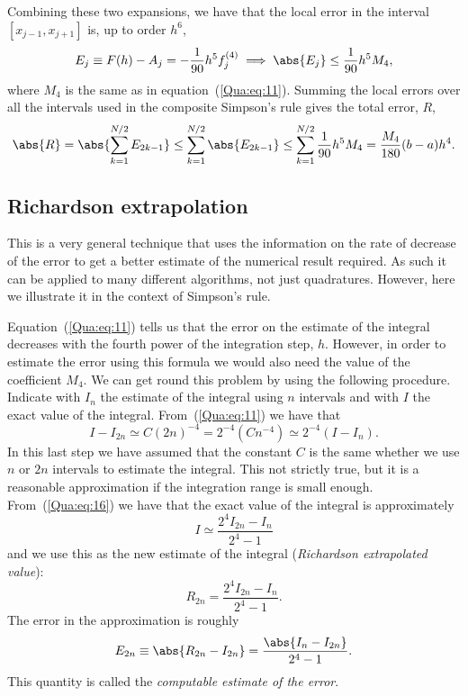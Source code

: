 %
Combining these two expansions, we have that the local error in the
interval $[x_{j-1},x_{j+1}]$ is, up to order $h^6$,
%
\begin{equation}
  E_j \equiv F(h) - A_j = - \frac{1}{90} h^5 f_j^{(4)} \implies
  \abs{E_j} \le \frac{1}{90} h^5 M_4 ,
  \label{Qua:eq:31}
\end{equation}
%
where $M_4$ is the same as in equation~(\ref{Qua:eq:11}).  Summing the
local errors over all the intervals used in the composite Simpson's
rule gives the total error, $R$,
%
\begin{equation}
  \abs{R} = \abs{\sum_{k=1}^{N/2} E_{2k-1}} \le
  \sum_{k=1}^{N/2} \abs{ E_{2k-1} } \le
  \sum_{k=1}^{N/2} \frac{1}{90} h^5 M_4 = \frac{M_4}{180}(b-a)h^4.
\end{equation}

\subsection{Richardson extrapolation}

This is a very general technique that uses the information on the rate
of decrease of the error to get a better estimate of the numerical
result required.  As such it can be applied to many different
algorithms, not just quadratures.  However, here we illustrate it in
the context of Simpson's rule.

Equation~(\ref{Qua:eq:11}) tells us that the error on the estimate of
the integral decreases with the fourth power of the integration step,
$h$.  However, in order to estimate the error using this formula we
would also need the value of the coefficient $M_4$.  We can get round
this problem by using the following procedure.  Indicate with $I_n$
the estimate of the integral using $n$ intervals and with $I$ the
exact value of the integral.  From~(\ref{Qua:eq:11}) we have that
%
\begin{equation}
  I - I_{2n} \simeq C (2n)^{-4} =
  2^{-4} \left ( C n^{-4} \right ) \simeq 2^{-4} (I - I_n) .
  \label{Qua:eq:16}
\end{equation}
%
In this last step we have assumed that the constant $C$ is the same
whether we use $n$ or $2n$ intervals to estimate the integral.  This
not strictly true, but it is a reasonable approximation if the
integration range is small enough.  From~(\ref{Qua:eq:16}) we have
that the exact value of the integral is approximately
%
\begin{equation*}
  I \simeq \frac{2^4 I_{2 n} - I_n}{2^4 -1}
\end{equation*}
%
and we use this as the new estimate of the integral
(\textit{Richardson extrapolated value}):
%
\begin{equation}
  R_{2 n} = \frac{2^4 I_{2 n} - I_n}{2^4 -1} .
  \label{Qua:eq:22}
\end{equation}
%
The error in the approximation is roughly
%
\begin{equation}
  E_{2n} \equiv \abs{ R_{2 n} - I_{2 n} } = \frac{\abs{I_n - I_{2 n}}}{2^4 -1} .
  \label{Qua:eq:17}
\end{equation}
%
This quantity is called the \textit{computable estimate of the error}.

